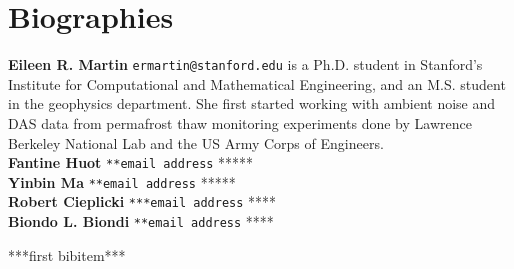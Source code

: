 \documentclass[11pt]{amsart}
\begin{document}


\section*{Biographies}
\textbf{Eileen R. Martin} \texttt{ermartin@stanford.edu} is a Ph.D. student in Stanford's Institute for Computational and Mathematical Engineering, and an M.S. student in the geophysics department. She first started working with ambient noise and DAS data from permafrost thaw monitoring experiments done by Lawrence Berkeley National Lab and the US Army Corps of Engineers.
\\
\textbf{Fantine Huot} \texttt{**email address} *****
\\
\textbf{Yinbin Ma} \texttt{**email address} *****
\\
\textbf{Robert Cieplicki} \texttt{***email address} ****
\\
\textbf{Biondo L. Biondi} \texttt{**email address} ****

\begin{thebibliography}{10}
 ***first bibitem***


\end{thebibliography}
\end{document}

